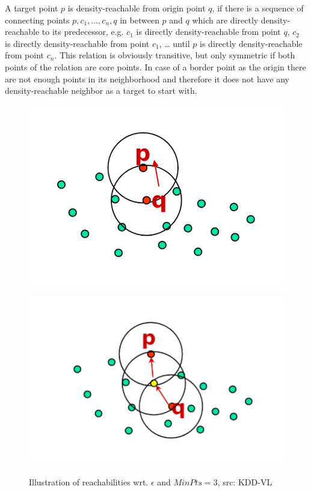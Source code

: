A target point $p$ is density-reachable from origin point $q$, if there is a sequence of connecting points $p, c_1, \dotsc, c_n, q$ in between $p$ and $q$ which are directly density-reachable to its predecessor, e.g. $c_1$ is directly density-reachable from point $q$, $c_2$ is directly density-reachable from point $c_1$, \dots{} until $p$ is directly density-reachable from point $c_n$. This relation is obviously transitive, but only symmetric if both points of the relation are core points. In case of a border point as the origin there are not enough points in its neighborhood and therefore it does not have any density-reachable neighbor as a target to start with.

\begin{figure}
    \centering
    \begin{minipage}[t]{.5\textwidth}
      \centering  
      \captionsetup{width=.9\linewidth}
      \includegraphics[width=.8\textwidth]{figures/directlydensityreachable.png}
      \label{fig:directdensityreachable}
    \end{minipage}%
    \begin{minipage}[t]{.5\textwidth}
      \centering
      \captionsetup{width=.9\linewidth}
      \includegraphics[width=.8\textwidth]{figures/density-reachable.png}
      \label{fig:densityreachable}
    \end{minipage}
    \caption{Illustration of reachabilities wrt. $\epsilon$ and $MinPts = 3$, src: KDD-VL}
\end{figure}

